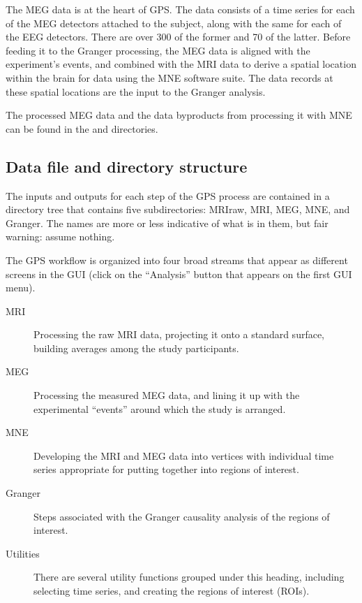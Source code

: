 \documentclass[11pt]{article}
\begin{document}
The MEG data is at the heart of GPS.  The data consists of a time
series for each of the MEG detectors attached to the subject, along
with the same for each of the EEG detectors.  There are over 300 of
the former and 70 of the latter.  Before feeding it to the Granger
processing, the MEG data is aligned with the experiment's events, and
combined with the MRI data to derive a spatial location within the
brain for data using the MNE software suite.  The data records at
these spatial locations are the input to the Granger analysis.

The processed MEG data and the data byproducts from processing it with
MNE can be found in the  and  directories.

\subsection{Data file and directory structure}

The inputs and outputs for each step of the GPS process are contained
in a directory tree that contains five subdirectories: MRIraw, MRI,
MEG, MNE, and Granger.  The names are more or less indicative of what
is in them, but fair warning: assume nothing.

The GPS workflow is organized into four broad streams that appear as
different screens in the GUI (click on the ``Analysis'' button that
appears on the first GUI menu).

\begin{description}

\item[MRI] Processing the raw MRI data, projecting it onto a standard
  surface, building averages among the study participants.

\item[MEG] Processing the measured MEG data, and lining it up with the
  experimental ``events'' around which the study is arranged.

\item[MNE] Developing the MRI and MEG data into vertices with
  individual time series appropriate for putting together into regions
  of interest.

\item[Granger] Steps associated with the Granger causality analysis of
  the regions of interest.

\item[Utilities] There are several utility functions grouped under
  this heading, including selecting time series, and creating the
  regions of interest (ROIs).

\end{description}
\end{document}
